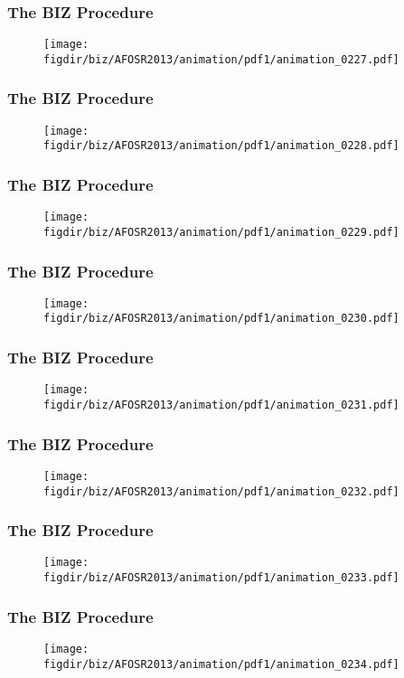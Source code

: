 \documentclass[13pt]{beamer}
\newcommand{\figdir}{../../fig}
\begin{document}
{\begin{frame}\frametitle{The BIZ Procedure}\begin{figure}\texttt{[image: \\figdir/biz/AFOSR2013/animation/pdf1/animation\_0227.pdf]}\end{figure}\end{frame}
\begin{frame}\frametitle{The BIZ Procedure}\begin{figure}\texttt{[image: \\figdir/biz/AFOSR2013/animation/pdf1/animation\_0228.pdf]}\end{figure}\end{frame}
\begin{frame}\frametitle{The BIZ Procedure}\begin{figure}\texttt{[image: \\figdir/biz/AFOSR2013/animation/pdf1/animation\_0229.pdf]}\end{figure}\end{frame}
\begin{frame}\frametitle{The BIZ Procedure}\begin{figure}\texttt{[image: \\figdir/biz/AFOSR2013/animation/pdf1/animation\_0230.pdf]}\end{figure}\end{frame}
\begin{frame}\frametitle{The BIZ Procedure}\begin{figure}\texttt{[image: \\figdir/biz/AFOSR2013/animation/pdf1/animation\_0231.pdf]}\end{figure}\end{frame}
\begin{frame}\frametitle{The BIZ Procedure}\begin{figure}\texttt{[image: \\figdir/biz/AFOSR2013/animation/pdf1/animation\_0232.pdf]}\end{figure}\end{frame}
\begin{frame}\frametitle{The BIZ Procedure}\begin{figure}\texttt{[image: \\figdir/biz/AFOSR2013/animation/pdf1/animation\_0233.pdf]}\end{figure}\end{frame}
\begin{frame}\frametitle{The BIZ Procedure}\begin{figure}\texttt{[image: \\figdir/biz/AFOSR2013/animation/pdf1/animation\_0234.pdf]}\end{figure}\end{frame}
}
\end{document}
